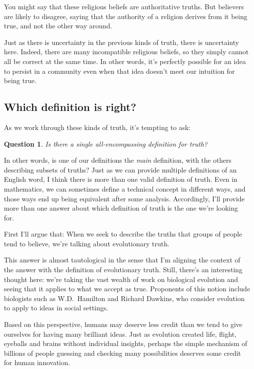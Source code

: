\documentclass[11pt, oneside]{article}
\newenvironment{answerwnum}[1]
  {\renewcommand\theinnercustomthm{#1}\innercustomthm}
  {\endinnercustomthm}
\newtheorem*{question*}{Question}
\begin{document}
You might say that these religious beliefs are authoritative truths.
But believers are likely to disagree, saying that the authority of a
religion derives from it being true, and not the other way around.

Just as there is uncertainty in the previous kinds of truth, there is
uncertainty here.
Indeed, there are many incompatible religious beliefs, so they simply
cannot all be correct at the same time.
In other words, it's perfectly possible for an idea to persist in a community
even when that idea doesn't meet our intuition for being true.

\subsection{Which definition is right?}

As we work through these kinds of truth, it's tempting to ask:
\begin{question*}\label{q3}
    Is there a single all-encompassing definition for truth?
\end{question*}
In other words, is one of our definitions the {\em main} definition, with the
others describing subsets of truths?
Just as we can provide multiple definitions of an English word, I think there
is more than one valid definition of truth.
Even in mathematics, we can sometimes
define a technical concept in different ways, and those
ways end up being equivalent after some analysis.
Accordingly, I'll provide more than one answer about
which definition of truth is the one
we're looking for.

First I'll argue that:
\begin{answerwnum}{A}
    When we seek to describe the truths that groups of people tend to believe,
    we're talking about evolutionary truth.
\end{answerwnum}

This answer is almost tautological in the sense that I'm aligning the context of
the answer with the definition of evolutionary truth.
Still, there's
an interesting thought here: we're taking the vast wealth of work on
biological evolution and seeing that it applies to what we accept as true.
Proponents of this notion include
biologists such as W.D.~Hamilton and
Richard Dawkins, who consider evolution to apply to ideas in
social settings.

Based on this perspective, humans
may deserve less credit than we tend to give ourselves for having many
brilliant ideas. Just as evolution created life, flight, eyeballs and
brains without individual insights, perhaps the simple mechanism of billions of
people guessing and checking many possibilities deserves some
credit for human innovation.
\end{document}
